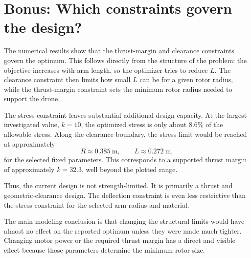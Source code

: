 \documentclass[11pt]{article}
\begin{document}
\section{Bonus: Which constraints govern the design?}

The numerical results show that the thrust-margin and clearance constraints
govern the optimum. This follows directly from the structure of the problem:
the objective increases with arm length, so the optimizer tries to reduce $L$.
The clearance constraint then limits how small $L$ can be for a given rotor
radius, while the thrust-margin constraint sets the minimum rotor radius needed
to support the drone.

The stress constraint leaves substantial additional design capacity. At the
largest investigated value, $k=10$, the optimized stress is only about $8.6\%$
of the allowable stress. Along the clearance boundary, the stress limit would
be reached at approximately
\begin{equation}
 R\approx0.385~\mathrm{m}, \qquad L\approx0.272~\mathrm{m},
\end{equation}
for the selected fixed parameters. This corresponds to a supported thrust
margin of approximately $k=32.3$, well beyond the plotted range.

Thus, the current design is not strength-limited. It is primarily a thrust and
geometric-clearance design. The deflection constraint is even less restrictive
than the stress constraint for the selected arm radius and material.

The main modeling conclusion is that changing the structural limits would have
almost no effect on the reported optimum unless they were made much tighter.
Changing motor power or the required thrust margin has a direct and visible
effect because those parameters determine the minimum rotor size.
\end{document}
